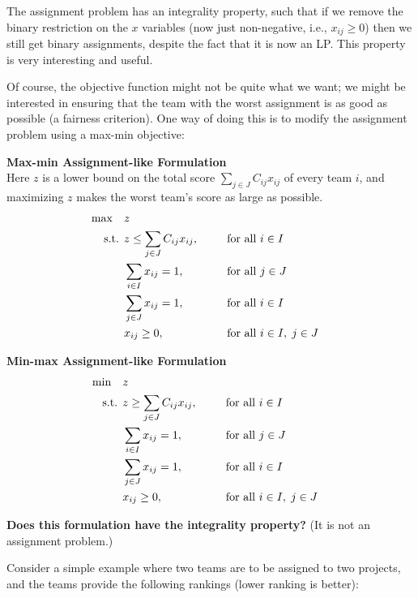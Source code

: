 The assignment problem has an integrality property, such that if we remove the binary restriction on the $x$ variables (now just non-negative, i.e., $x_{ij} \ge 0$) then we still get binary assignments, despite the fact that it is now an LP.  This property is very interesting and useful. 

Of course, the objective function might not be quite what we want; we might be interested in ensuring that the team with the worst assignment is as good as possible (a fairness criterion). One way of doing this is to modify the assignment problem using a max-min objective:

\medskip \textbf{Max-min Assignment-like Formulation} \\
Here $z$ is a lower bound on the total score $\sum_{j \in J} C_{ij} x_{ij}$ of every team $i$, and maximizing $z$ makes the worst team's score as large as possible.
\begin{align*}
\max \quad & z  \nonumber \\
\text{ s.t. }        & z \leq \sum_{j \in J} C_{i j} x_{i j},~~ &&\quad \text{for all } i \in I \\
   & \sum_{i \in I} x_{i j} = 1,~~ &&\quad \text{for all } j \in J \\
         & \sum_{j \in J} x_{i j} = 1,~~ &&\quad \text{for all } i \in I \\
         & x_{i j} \ge 0,~~ &&\quad \text{for all } i \in I, \; j \in J
\end{align*}

\medskip \textbf{Min-max Assignment-like Formulation} \\
\begin{align*}
\min \quad & z  \nonumber \\
\text{ s.t. }        & z \geq \sum_{j \in J} C_{i j} x_{i j},~~ &&\quad \text{for all } i \in I \\
   & \sum_{i \in I} x_{i j} = 1,~~ &&\quad \text{for all } j \in J \\
         & \sum_{j \in J} x_{i j} = 1,~~ &&\quad \text{for all } i \in I \\
         & x_{i j} \ge 0,~~ &&\quad \text{for all } i \in I, \; j \in J
\end{align*}

\medskip \textbf{Does this formulation have the integrality property?}  
(It is not an assignment problem.)

Consider a simple example where two teams are to be assigned to two projects, and the teams provide the following rankings (lower ranking is better):

